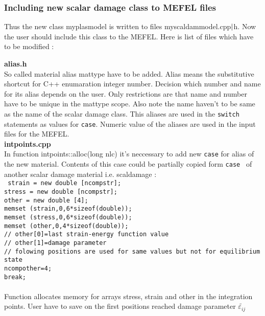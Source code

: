 \subsubsection {Including new scalar damage class to MEFEL files}
Thus the new class {\sf myplasmodel} is written to files myscaldammodel.cpp${\rm |}$h. Now the user should
include this class to the MEFEL. Here is list of files which have to be modified :

{\bf alias.h}\\
So called material alias {\sf mattype} have to be added. Alias means the substitutive shortcut
for C++ enumaration integer number. Decision which number and name for its alias depends on the user.
Only restrictions are that name and number have to be unique in the {\sf mattype} scope. Also note
the name haven't to be same as the name of the scalar damage class. This aliases are used in the
{\tt switch} statements as values for {\tt case}. Numeric value of the aliases are used in the input
files for the MEFEL.\\

{\bf intpoints.cpp}\\
In function {\sf intpoints::alloc(long nlc)} it's neccessary to add new {\tt case} for alias of
the new material. Contents of this case could be partially copied form {\tt case } of another scalar
damage material i.e. {\sf scaldamage} :\\
{\tt
    strain = new double [ncompstr];\\
    stress = new double [ncompstr];\\
    other = new double [4];\\
    memset (strain,0,6*sizeof(double));\\
    memset (stress,0,6*sizeof(double));\\
    memset (other,0,4*sizeof(double));\\
    //  other[0]=last strain-energy function value\\
    //  other[1]=damage parameter\\
    //  folowing positions are used for same values but not for equilibrium state\\
    ncompother=4;\\
    break;\\
}\\
Function allocates memory for arrays {\sf stress, strain} and {\sf other} in the integration points.
User have to save on the first positions reached damage parameter $\tilde{\varepsilon_{ij}}$

